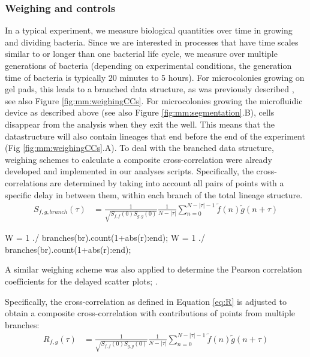 {


\subsubsection{Weighing and controls}

In a typical experiment, we measure biological quantities over time in growing and dividing bacteria. 
%
Since we are interested in processes that have time scales similar to or longer than one bacterial life cycle, we measure over multiple generations of bacteria (depending on experimental conditions, the generation time of bacteria is typically 20 minutes to 5 hours).
%
For microcolonies growing on gel pads, this leads to a branched data structure, as was previously described \cite{Kiviet2010,Walker2016t}, see also Figure \ref{fig:mm:weighingCCs}. 
% 
For microcolonies growing the microfluidic device as described above (see also Figure \ref{fig:mm:segmentation}.B), cells disappear from the analysis when they exit the well. This means that the datastructure will also contain lineages that end before the end of the experiment (Fig \ref{fig:mm:weighingCCs}.A).
%
To deal with the branched data structure, weighing schemes to calculate a composite cross-correlation were already developed and implemented in our analyses scripts.
%
Specifically, the cross-correlations are determined by taking into account all pairs of points with a specific delay in between them, within each branch of the total lineage structure.
%
\begin{align}
	\label{eq:Sbranch}
	S_{f,g,branch}(\tau) 
	& = \frac{1}{\sqrt{S_{f,f}(0)S_{g,g}(0)}} \frac{1}{N-|\tau|} 
	\sum_{n=0}^{N-|\tau|-1} {\tilde{f}(n) \tilde{g}(n+\tau)} 
\end{align}

W = 1 ./ branches(br).count(1+abs(r):end); 
W = 1 ./ branches(br).count(1+abs(r):end); 


A similar weighing scheme was also applied to determine the Pearson correlation coefficients for the delayed scatter plots;
.


Specifically, the cross-correlation as defined in Equation \ref{eq:R} is adjusted to obtain a composite cross-correlation with contributions of points from multiple branches:
\begin{align}
	\label{eq:Rcomposite}
	R_{f,g}(\tau) 
	& = \frac{1}{\sqrt{S_{f,f}(0)S_{g,g}(0)}} \frac{1}{N-|\tau|} 
	\sum_{n=0}^{N-|\tau|-1} {\tilde{f}(n) \tilde{g}(n+\tau)} 
\end{align}

}
